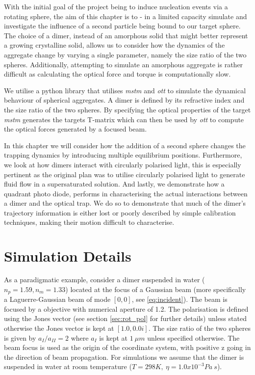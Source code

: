 With the initial goal of the project being to induce 
nucleation events via a rotating sphere, the aim of this 
chapter is to - in a limited capacity simulate and investigate 
the influence of a second particle being bound to our target 
sphere. The choice of a dimer, instead of an amorphous solid 
that might better represent a growing crystalline solid, 
allows us to consider how the dynamics of the aggregate change 
by varying a single parameter, namely the size ratio of the 
two spheres. Additionally, attempting to simulate an amorphous 
aggregate is rather difficult as calculating the optical force 
and torque is computationally slow. 

We utilise a python library that utilises \textit{mstm} and
\textit{ott} to simulate the dynamical behaviour of spherical
aggregates. A dimer is defined by its refractive index and the 
size ratio of the two spheres.  By specifying the optical 
properties of the target \textit{mstm} generates the targets 
T-matrix which can then be used by \textit{ott} to compute the 
optical forces generated by a focused beam. 

In this chapter we will consider how the addition of a 
second sphere changes the trapping dynamics by introducing 
multiple equilibrium positions. Furthermore, we look at how 
dimers interact with circularly polarised light, this is 
especially pertinent as the original plan was to utilise 
circularly polarised light to generate fluid flow in a 
supersaturated solution. And lastly, we demonstrate how a 
quadrant photo diode, performs in characterising the actual 
interactions between a dimer and the optical trap. We do so 
to demonstrate that much of the dimer's trajectory information 
is either lost or poorly described by simple calibration 
techniques, making their motion difficult to characterise.
 
\section{Simulation Details}
As a paradigmatic example, consider a dimer suspended in 
water ($n_p = 1.59, n_m = 1.33$) located at the focus of 
a Gaussian beam (more specifically a Laguerre-Gaussian 
beam of mode $[0,0]$, see \eqref{eq:incident}). The beam 
is focused by a objective with numerical aperture of 1.2.
The polarisation is defined using the Jones vector (see 
section \ref{sec:rot_pol} for further details) unless 
stated otherwise the Jones vector is kept at $[1.0, 0.0i]$. 
The size ratio of the two spheres is given by $a_{I}/
a_{II} = 2$ where $a_{I}$ is kept at $1\ \mu m$ unless 
specified otherwise. The beam focus is used as the 
origin of the coordinate system, with positive z going 
in the direction of beam propagation. For simulations 
we assume that the dimer is suspended in water at room 
temperature ($T = 298K,\ \eta = 1.0x10^{-3}Pa\ s$).

